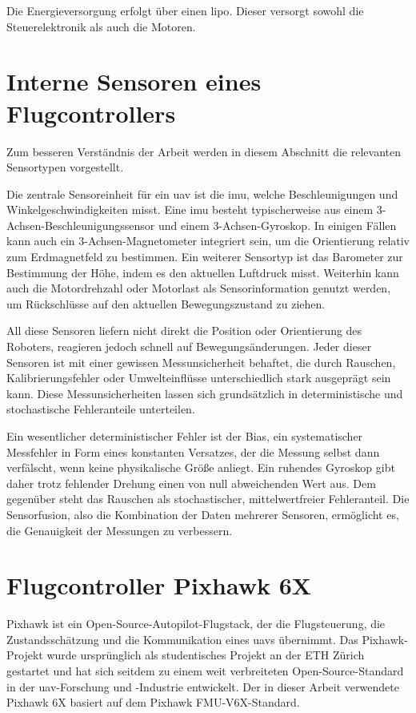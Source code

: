 Die Energieversorgung erfolgt über einen \gls{lipo}.
Dieser versorgt sowohl die Steuerelektronik als auch die Motoren.


\section{Interne Sensoren eines Flugcontrollers}
\label{sec:sensorik}
Zum besseren Verständnis der Arbeit werden in diesem Abschnitt die relevanten Sensortypen vorgestellt.

Die zentrale Sensoreinheit für ein \gls{uav} ist die \gls{imu}, welche Beschleunigungen und Winkelgeschwindigkeiten misst.
Eine \gls{imu} besteht typischerweise aus einem 3-Achsen-Beschleunigungssensor und einem 3-Achsen-Gyroskop.
In einigen Fällen kann auch ein 3-Achsen-Magnetometer integriert sein, um die Orientierung relativ zum Erdmagnetfeld zu bestimmen.
Ein weiterer Sensortyp ist das Barometer zur Bestimmung der Höhe, indem es den aktuellen Luftdruck misst.
Weiterhin kann auch die Motordrehzahl oder Motorlast als Sensorinformation genutzt werden, um Rückschlüsse auf den aktuellen Bewegungszustand zu ziehen.~\cite{Siciliano2009}

All diese Sensoren liefern nicht direkt die Position oder Orientierung des Roboters, reagieren jedoch schnell auf Bewegungsänderungen.
Jeder dieser Sensoren ist mit einer gewissen Messunsicherheit behaftet, die durch Rauschen, Kalibrierungsfehler oder Umwelteinflüsse unterschiedlich stark ausgeprägt sein kann.
Diese Messunsicherheiten lassen sich grundsätzlich in deterministische und stochastische Fehleranteile unterteilen.~\cite{Capuano2023}

Ein wesentlicher deterministischer Fehler ist der Bias, ein systematischer Messfehler in Form eines konstanten Versatzes, der die Messung selbst dann verfälscht, wenn keine physikalische Größe anliegt.
Ein ruhendes Gyroskop gibt daher trotz fehlender Drehung einen von null abweichenden Wert aus.
Dem gegenüber steht das Rauschen als stochastischer, mittelwertfreier Fehleranteil.
Die Sensorfusion, also die Kombination der Daten mehrerer Sensoren, ermöglicht es, die Genauigkeit der Messungen zu verbessern.~\cite{chen2024deep}



\section{Flugcontroller Pixhawk 6X}
\label{sec:Pixhawk_6X}
Pixhawk ist ein Open-Source-Autopilot-Flugstack, der die Flugsteuerung, die Zustandsschätzung und die Kommunikation eines \gls{uav}s übernimmt.
Das Pixhawk-Projekt wurde ursprünglich als studentisches Projekt an der ETH Zürich gestartet 
und hat sich seitdem zu einem weit verbreiteten Open-Source-Standard 
in der \gls{uav}-Forschung und -Industrie entwickelt.
Der in dieser Arbeit verwendete Pixhawk 6X basiert auf dem Pixhawk FMU-V6X-Standard.~\cite{px4_pixhawk6x_doc, MendozaMendoza2020}

